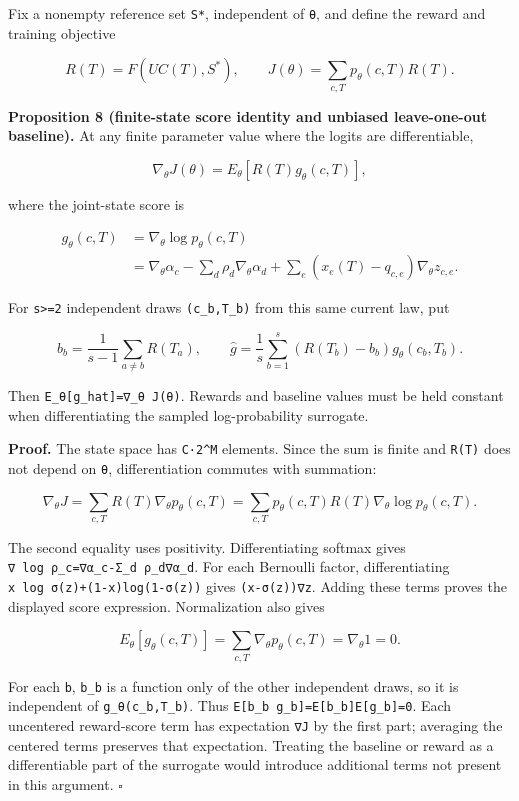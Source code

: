 \documentclass[
  11pt,
]{article}
\begin{document}
Fix a nonempty reference set \texttt{S*}, independent of \texttt{θ}, and
define the reward and training objective

\[
R(T)=F(UC(T),S^*),\qquad
J(\theta)=\sum_{c,T}p_\theta(c,T)R(T).
\]

\textbf{Proposition 8 (finite-state score identity and unbiased
leave-one-out baseline).} At any finite parameter value where the logits
are differentiable,

\[
\nabla_\theta J(\theta)
=E_\theta[R(T)g_\theta(c,T)],
\]

where the joint-state score is

\[
\begin{aligned}
g_\theta(c,T)
&=\nabla_\theta\log p_\theta(c,T)\\
&=\nabla_\theta\alpha_c-
\sum_d\rho_d\nabla_\theta\alpha_d+
\sum_e(x_e(T)-q_{c,e})\nabla_\theta z_{c,e}.
\end{aligned}
\]

For \texttt{s\textgreater{}=2} independent draws \texttt{(c\_b,T\_b)}
from this same current law, put

\[
b_b=\frac{1}{s-1}\sum_{a\ne b}R(T_a),\qquad
\widehat g=\frac{1}{s}\sum_{b=1}^{s}(R(T_b)-b_b)g_\theta(c_b,T_b).
\]

Then \texttt{E\_θ{[}g\_hat{]}=∇\_θ\ J(θ)}. Rewards and baseline values
must be held constant when differentiating the sampled log-probability
surrogate.

\textbf{Proof.} The state space has \texttt{C·2\^{}M} elements. Since
the sum is finite and \texttt{R(T)} does not depend on \texttt{θ},
differentiation commutes with summation:

\[
\nabla_\theta J=
\sum_{c,T}R(T)\nabla_\theta p_\theta(c,T)
=\sum_{c,T}p_\theta(c,T)R(T)\nabla_\theta\log p_\theta(c,T).
\]

The second equality uses positivity. Differentiating softmax gives
\texttt{∇\ log\ ρ\_c=∇α\_c-Σ\_d\ ρ\_d∇α\_d}. For each Bernoulli factor,
differentiating \texttt{x\ log\ σ(z)+(1-x)log(1-σ(z))} gives
\texttt{(x-σ(z))∇z}. Adding these terms proves the displayed score
expression. Normalization also gives

\[
E_\theta[g_\theta(c,T)]
=\sum_{c,T}\nabla_\theta p_\theta(c,T)
=\nabla_\theta 1=0.
\]

For each \texttt{b}, \texttt{b\_b} is a function only of the other
independent draws, so it is independent of \texttt{g\_θ(c\_b,T\_b)}.
Thus \texttt{E{[}b\_b\ g\_b{]}=E{[}b\_b{]}E{[}g\_b{]}=0}. Each
uncentered reward-score term has expectation \texttt{∇J} by the first
part; averaging the centered terms preserves that expectation. Treating
the baseline or reward as a differentiable part of the surrogate would
introduce additional terms not present in this argument. \(\square\)
\end{document}
